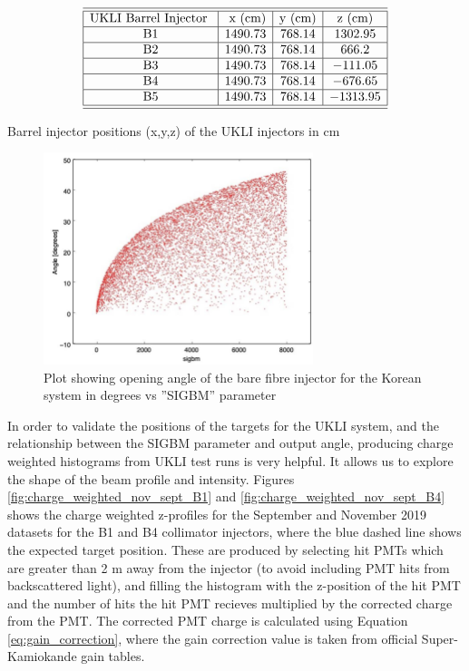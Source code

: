 \begin{table}[htp]
    $$
\begin{array}{|c|c|c|c|c|c|}  
    \hline \hline{\text {UKLI Barrel Injector }} & {\text { x (cm)}} & {\text {y (cm)}} & {\text {z (cm)}}  \tabularnewline
    \hline \text { B1 } & 1490.73 & 768.14 & 1302.95 \\
    \hline \text { B2 } & 1490.73 & 768.14 & 666.2 \\
    \hline \text { B3 } & 1490.73 & 768.14 & -111.05 \\
    \hline \text { B4 } & 1490.73 & 768.14 & -676.65 \\
    \hline \text { B5 } & 1490.73 & 768.14 &  -1313.95 \\
    \hline \hline 
\end{array}
    $$
\caption{Barrel injector positions (x,y,z) of the UKLI injectors in cm} 
\label{table:UKLI_loc}
\end{table}

\begin{figure}
    \centering
    \includegraphics[width=0.7\textwidth]{Figures/sigbm_angle.png}
    \caption{Plot showing opening angle of the bare fibre injector for the Korean system in degrees vs ''SIGBM'' parameter}
    \label{fig:sigbm_angle}
\end{figure}

In order to validate the positions of the targets for the UKLI system, and the relationship between the SIGBM parameter and output angle, producing charge weighted histograms from UKLI test runs is very helpful. It allows us to explore the shape of the beam profile and intensity. Figures \ref{fig:charge_weighted_nov_sept_B1} and \ref{fig:charge_weighted_nov_sept_B4} shows the charge weighted z-profiles for the September and November 2019 datasets for the B1 and B4 collimator injectors, where the blue dashed line shows the expected target position. These are produced by selecting hit PMTs which are greater than 2 m away from the injector (to avoid including PMT hits from backscattered light), and filling the histogram with the z-position of the hit PMT and the number of hits the hit PMT recieves multiplied by the corrected charge from the PMT. The corrected PMT charge is calculated using Equation \ref{eq:gain_correction}, where the gain correction value is taken from official Super-Kamiokande gain tables. 

